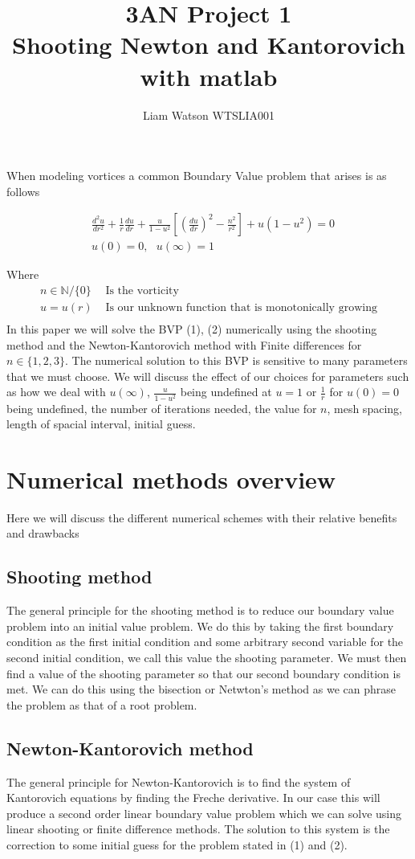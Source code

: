 \documentclass{article}
\title{3AN Project 1\\ Shooting Newton and Kantorovich with matlab}
\author{Liam Watson WTSLIA001}
\begin{document}
\maketitle
When modeling vortices a common Boundary Value problem that arises is as follows


\begin{align}
&\frac{d^2 u}{dr^2} + \frac{1}{r}\frac{du}{dr} + \frac{u}{1-u^2}\left[\left(\frac{du}{dr}\right)^2 - \frac{n^2}{r^2}\right] + u(1-u^2) = 0 \\
&u(0) = 0,\ \ \  u(\infty) = 1
\end{align}

Where 
\begin{align*}
n\in \mathbb{N}/\{0\}&  \text{\ \ \ \ \ Is the vorticity} \\
u = u(r)& \text{ \ \ \ \ Is our unknown function that is monotonically growing}\\ 
\end{align*}
In this paper we will solve the BVP (1), (2) numerically using the shooting method and the Newton-Kantorovich method with Finite differences for $n\in \{1,2,3\}$. The numerical solution to this BVP is sensitive to many parameters that we must choose. We will discuss the effect of our choices for parameters such as how we deal with $u(\infty)$, $\frac{u}{1-u^2}$ being undefined at $u = 1$ or $\frac{1}{r}$ for $u(0) = 0$ being undefined, the number of iterations needed, the value for $n$, mesh spacing, length of spacial interval, initial guess.

\section{Numerical methods overview}
Here we will discuss the different numerical schemes with their relative benefits and drawbacks 
\subsection{Shooting method}
The general principle for the shooting method is to reduce our boundary value problem into an initial value problem. We do this by taking the first boundary condition as the first initial condition and some arbitrary second variable for the second initial condition, we call this value the shooting parameter. We must then find a value of the shooting parameter so that our second boundary condition is met. We can do this using the bisection or Netwton's method as we can phrase the problem as that of a root problem.     
\subsection{Newton-Kantorovich method}
The general principle for Newton-Kantorovich is to find the system of Kantorovich equations by finding the Freche derivative. In our case this will produce a second order linear boundary value problem which we can solve using linear shooting or finite difference methods. The solution to this system is the correction to some initial guess for the problem stated in (1) and (2).  
\end{document}
